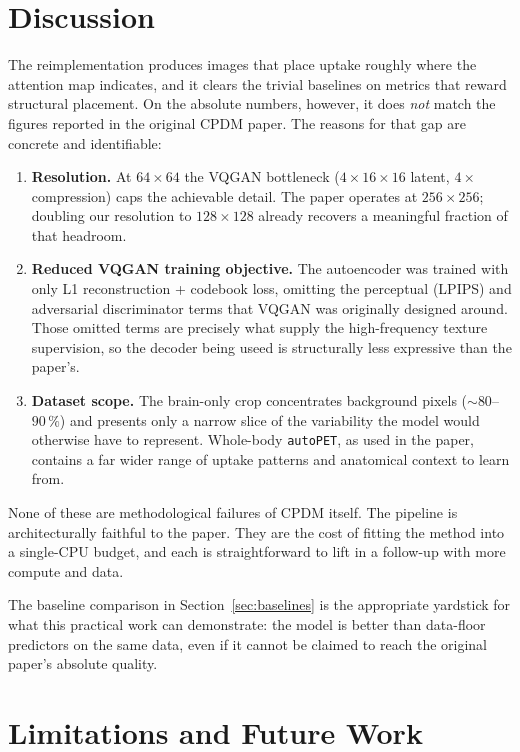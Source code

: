 \documentclass[11pt,a4paper]{article}
\begin{document}
\section{Discussion}

The reimplementation produces images that place uptake roughly where the 
attention map indicates, and it clears the trivial baselines on metrics 
that reward structural placement. On the absolute numbers, however, 
it does \emph{not} match the figures reported in the original CPDM paper. 
The reasons for that gap are concrete and identifiable:
\begin{enumerate}
  \item \textbf{Resolution.} At $64 \times 64$ the VQGAN bottleneck ($4 \times 16 \times 16$ latent, $4\times$ compression) caps the achievable detail. The paper operates at $256 \times 256$; doubling our resolution to $128 \times 128$ already recovers a meaningful fraction of that headroom.
  \item \textbf{Reduced VQGAN training objective.} The autoencoder was trained
  with only L1 reconstruction + codebook loss, omitting the perceptual 
  (LPIPS) and adversarial discriminator terms that VQGAN was originally 
  designed around. Those omitted terms are precisely what supply the 
  high-frequency texture supervision, so the decoder being useed is structurally 
  less expressive than the paper's.
  \item \textbf{Dataset scope.} The brain-only crop concentrates background pixels ($\sim 80$--$90\,\%$) and presents only a narrow slice of the variability the model would otherwise have to represent. Whole-body \texttt{autoPET}, as used in the paper, contains a far wider range of uptake patterns and anatomical context to learn from.
\end{enumerate}

None of these are methodological failures of CPDM itself. The pipeline is 
architecturally faithful to the paper. They are the cost of fitting the 
method into a single-CPU budget, and each is straightforward to lift in a 
follow-up with more compute and data.

The baseline comparison in Section~\ref{sec:baselines} is the appropriate 
yardstick for what this practical work can demonstrate: the model 
is better than data-floor predictors on the same data, even if it 
cannot be claimed to reach the original paper's absolute quality.

\section{Limitations and Future Work}
\end{document}
